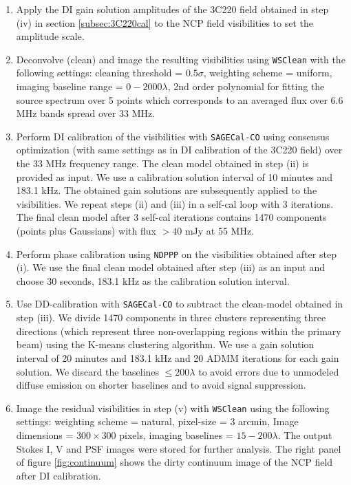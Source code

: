\documentclass[fleqn,usenatbib]{mnras}
\begin{document}
\begin{enumerate}
\item Apply the DI gain solution amplitudes of the 3C220 field obtained in step (iv) in section \ref{subsec:3C220cal} to the NCP field visibilities to set the amplitude scale.

\item Deconvolve (clean) and image the resulting visibilities using \texttt{WSClean} with the following settings: cleaning threshold = $0.5\sigma$, weighting scheme = uniform, imaging baseline range = $0-2000\lambda$, 2nd order polynomial for fitting the source spectrum over 5 points which corresponds to an averaged flux over 6.6 MHz bands spread over 33 MHz. 

\item Perform DI calibration of the visibilities with \texttt{SAGECal-CO} using consensus optimization (with same settings as in DI calibration of the 3C220 field) over the 33 MHz frequency range. The clean model obtained in step (ii) is provided as input. We use a calibration solution interval of 10 minutes and 183.1 kHz. The obtained gain solutions are subsequently applied to the visibilities. We repeat steps (ii) and (iii) in a self-cal loop with 3 iterations. The final clean model after 3 self-cal iterations contains 1470 components (points plus Gaussians) with flux $> 40$ mJy at 55 MHz. 

\item Perform phase calibration using \texttt{NDPPP} on the visibilities obtained after step (i). We use the final clean model obtained after step (iii) as an input and choose 30 seconds, 183.1 kHz as the calibration solution interval.

\item Use DD-calibration with \texttt{SAGECal-CO} to subtract the clean-model obtained in step (iii). We divide 1470 components in three clusters representing three directions (which represent three non-overlapping regions within the primary beam) using the K-means clustering algorithm. We use a gain solution interval of 20 minutes and 183.1 kHz and 20 ADMM iterations for each gain solution. We discard the baselines $\leq 200\lambda$ to avoid errors due to unmodeled diffuse emission on shorter baselines and to avoid signal suppression. 

\item Image the residual visibilities in step (v) with \texttt{WSClean} using the following settings: weighting scheme = natural, pixel-size = 3 arcmin, Image dimensions = $300\times 300$ pixels, imaging baselines = $15 - 200 \lambda$. The output Stokes I, V and PSF images were stored for further analysis. The right panel of figure \ref{fig:continuum} shows the dirty continuum image of the NCP field after DI calibration.

\end{enumerate}
\end{document}

